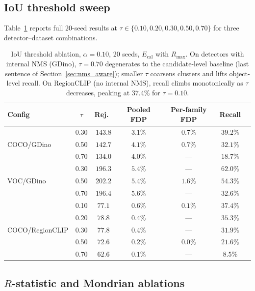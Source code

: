 \documentclass{article}
\theoremstyle{remark}
\newcommand{\1}{\mathbf{1}}
\begin{document}
\subsection{IoU threshold sweep}
\label{app:iou_sweep}

Table~\ref{tab:iou_sweep} reports full 20-seed results at
$\tau\in\{0.10,0.20,0.30,0.50,0.70\}$ for three detector--dataset
combinations.

\begin{table}[h]
\centering
\small
\begin{tabular*}{\linewidth}{@{\extracolsep{\fill}}lcccccc@{}}
\toprule
Config & $\tau$ & Rej.\ & Pooled FDP & Per-family FDP & Recall \\
\midrule
\multirow{3}{*}{COCO/GDino}
 & 0.30 & $143.8$ & $3.1\%$ & $0.7\%$ & $39.2\%$ \\
 & 0.50 & $142.7$ & $4.1\%$ & $0.7\%$ & $32.1\%$ \\
 & 0.70 & $134.0$ & $4.0\%$ & ---     & $18.7\%$ \\
\midrule
\multirow{3}{*}{VOC/GDino}
 & 0.30 & $196.3$ & $5.4\%$ & ---     & $62.0\%$ \\
 & 0.50 & $202.2$ & $5.4\%$ & $1.6\%$ & $54.3\%$ \\
 & 0.70 & $196.4$ & $5.6\%$ & ---     & $32.6\%$ \\
\midrule
\multirow{5}{*}{COCO/RegionCLIP}
 & 0.10 & $77.1$  & $0.6\%$ & $0.1\%$ & $\mathbf{37.4\%}$ \\
 & 0.20 & $78.8$  & $0.4\%$ & ---     & $35.3\%$ \\
 & 0.30 & $77.8$  & $0.4\%$ & ---     & $31.9\%$ \\
 & 0.50 & $72.6$  & $0.2\%$ & $0.0\%$ & $21.6\%$ \\
 & 0.70 & $62.6$  & $0.1\%$ & ---     & $8.5\%$  \\
\bottomrule
\end{tabular*}
\caption{IoU threshold ablation, $\alpha=0.10$, 20 seeds,
$E_{\mathrm{cal}}$ with $R_{\max}$. On detectors with internal NMS
(GDino), $\tau=0.70$ degenerates to the candidate-level baseline (last
sentence of Section~\ref{sec:nms_aware}); smaller $\tau$ coarsens clusters and
lifts object-level recall. On RegionCLIP (no internal NMS), recall
climbs monotonically as $\tau$ decreases, peaking at
$37.4\%$ for $\tau=0.10$.}
\label{tab:iou_sweep}
\end{table}

\subsection{$R$-statistic and Mondrian ablations}
\label{app:rstat_ablation}
\end{document}
